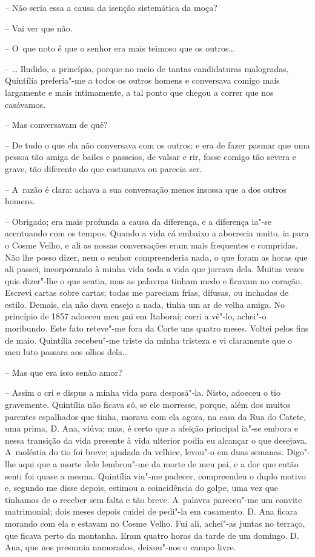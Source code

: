 -- Não seria essa a causa da isenção sistemática da moça?

-- Vai ver que não.

-- O~que noto é que o senhor era mais teimoso que os outros\ldots{}

-- \ldots{} Iludido, a princípio, porque no meio de tantas candidaturas
malogradas, Quintília preferia"-me a todos os outros homens e conversava
comigo mais largamente e mais intimamente, a tal ponto que chegou a
correr que nos casávamos.

-- Mas conversavam de quê?

-- De tudo o que ela não conversava com os outros; e era de fazer pasmar
que uma pessoa tão amiga de bailes e passeios, de valsar e rir, fosse
comigo tão severa e grave, tão diferente do que costumava ou parecia
ser.

-- A~razão é clara: achava a sua conversação menos insossa que a dos
outros homens.

-- Obrigado; era mais profunda a causa da diferença, e a diferença ia"-se
acentuando com os tempos. Quando a vida cá embaixo a aborrecia muito, ia
para o Cosme Velho, e ali as nossas conversações eram mais frequentes e
compridas. Não lhe posso dizer, nem o senhor compreenderia nada, o que
foram as horas que ali passei, incorporando à minha vida toda a vida que
jorrava dela. Muitas vezes quis dizer"-lhe o que sentia, mas as palavras
tinham medo e ficavam no coração. Escrevi cartas sobre cartas; todas me
pareciam frias, difusas, ou inchadas de estilo. Demais, ela não dava
ensejo a nada, tinha um ar de velha amiga. No princípio de 1857 adoeceu
meu pai em Itaboraí; corri a vê"-lo, achei"-o moribundo. Este fato
reteve"-me fora da Corte uns quatro meses. Voltei pelos fins de maio.
Quintília recebeu"-me triste da minha tristeza e vi claramente que o meu
luto passara aos olhos dela\ldots{}

-- Mas que era isso senão amor?

-- Assim o cri e dispus a minha vida para desposá"-la. Nisto, adoeceu o
tio gravemente. Quintília não ficava só, se ele morresse, porque, além
dos muitos parentes espalhados que tinha, morava com ela agora, na casa
da Rua do Catete, uma prima, D. Ana, viúva; mas, é certo que a afeição
principal ia"-se embora e nessa transição da vida presente à vida
ulterior podia eu alcançar o que desejava. A~moléstia do tio foi breve;
ajudada da velhice, levou"-o em duas semanas. Digo"-lhe aqui que a morte
dele lembrou"-me da morte de meu pai, e a dor que então senti foi quase a
mesma. Quintília viu"-me padecer, compreendeu o duplo motivo e, segundo
me disse depois, estimou a coincidência do golpe, uma vez que tínhamos
de o receber sem falta e tão breve. A~palavra pareceu"-me um convite
matrimonial; dois meses depois cuidei de pedi"-la em casamento. D. Ana
ficara morando com ela e estavam no Cosme Velho. Fui ali, achei"-as
juntas no terraço, que ficava perto da montanha. Eram quatro horas da
tarde de um domingo. D. Ana, que nos presumia namorados, deixou"-nos o
campo livre.

